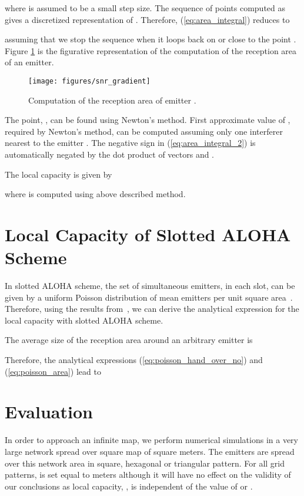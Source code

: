 \documentclass[12pt,english]{article}
\begin{document}
where  is assumed to be a small step size. The sequence of points  computed as 
 gives a discretized representation of . 
Therefore, (\ref{eq:area_integral}) reduces to

assuming that we stop the sequence  when it loops back on or close to the point . Figure \ref{fig:rx_area_method} is the figurative representation of the computation of the reception area of an emitter. 

\begin{figure}[!t]
\centering
{}
\texttt{[image: figures/snr\_gradient]}
\caption{Computation of the reception area of emitter .\label{fig:snr_gradient}}
\label{fig:rx_area_method}
\end{figure}

The point, \mbox{}, can be found using Newton's method. First approximate value of , required by Newton's method, can be computed assuming only one interferer nearest to the emitter . The negative sign in (\ref{eq:area_integral_2}) is automatically negated by the dot product of vectors  and .

The local capacity is given by
 
where  is computed using above described method. 

\section{Local Capacity of Slotted ALOHA Scheme}
\label{sec:aloha}

In slotted ALOHA scheme, the set of simultaneous emitters, in each slot, can be given by a uniform Poisson distribution of mean  emitters per unit square area~\cite{Jacquet:2009,SR-ALOHA,Weber2}. Therefore, using the results from~\cite{Jacquet:2009}, we can derive the analytical expression for the local capacity with slotted ALOHA scheme. 

The average size of the reception area around an arbitrary emitter is 




Therefore, the analytical expressions (\ref{eq:poisson_hand_over_no}) and (\ref{eq:poisson_area}) lead to


\section{Evaluation}
\label{sec:evaluate}

In order to approach an infinite map, we perform numerical simulations in a very large network spread over  square map of  square meters. The emitters are spread over this network area in square, hexagonal or triangular pattern. For all grid patterns, \mbox{} is set equal to  meters although it will have no effect on the validity of our conclusions as local capacity, , is independent of the value of  or . 
\end{document}
